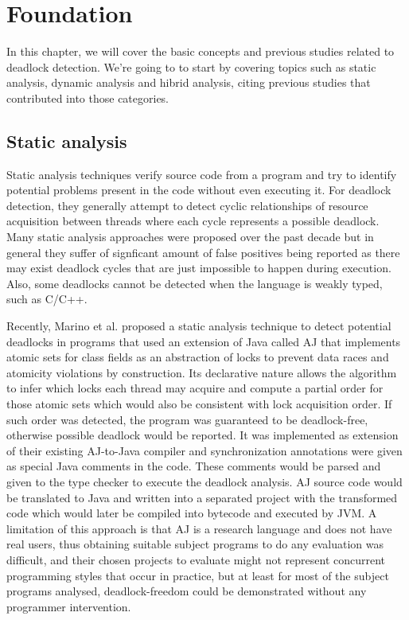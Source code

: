 \chapter{Foundation}

In this chapter, we will cover the basic concepts and previous studies related to deadlock detection. We're going to to start by covering topics such as static analysis, dynamic analysis and hibrid analysis, citing previous studies that contributed into those categories.

\section{Static analysis}

Static analysis techniques verify source code from a program and try to identify potential problems present in the code without even executing it.
For deadlock detection, they generally attempt to detect cyclic relationships of resource acquisition between threads where each cycle represents a possible deadlock.
Many static analysis approaches were proposed over the past decade \cite{dawson}\cite{chand}\cite{vivek}\cite{praun}\cite{cormac}\cite{williams}
but in general they suffer of signficant amount of false positives being reported as there may exist deadlock cycles that are just impossible to happen during execution.
Also, some deadlocks cannot be detected when the language is weakly typed, such as C/C++.

Recently, Marino et al. \cite{marino} proposed a static analysis technique to detect potential deadlocks in programs that
used an extension of Java called AJ that implements atomic sets for class fields as an abstraction of locks to prevent data races
and atomicity violations by construction. Its declarative nature allows the algorithm to infer which locks each thread may acquire and
compute a partial order for those atomic sets which would also be consistent with lock acquisition order.
If such order was detected, the program was guaranteed to be deadlock-free, otherwise possible deadlock would be reported.
It was implemented as extension of their existing AJ-to-Java compiler and synchronization annotations were given as special Java comments in the code.
These comments would be parsed and given to the type checker to execute the deadlock analysis. AJ source code would be translated to Java and written into a separated project
with the transformed code which would later be compiled into bytecode and executed by JVM. A limitation of this approach is that AJ is a research language
and does not have real users, thus obtaining suitable subject programs to do any evaluation was difficult, and their chosen projects to evaluate might not
represent concurrent programming styles that occur in practice, but at least for most of the subject programs analysed, deadlock-freedom could be demonstrated
without any programmer intervention.

